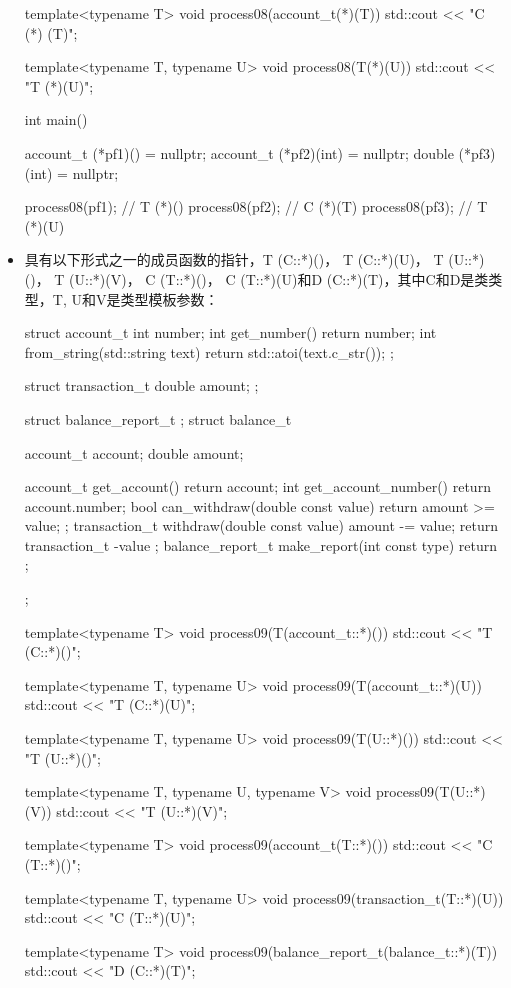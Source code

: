 \begin{itemize}
\begin{cpp}
template<typename T>
void process08(account_t(*)(T))
{ std::cout << "C (*) (T)\n"; }

template<typename T, typename U>
void process08(T(*)(U)) { std::cout << "T (*)(U)\n"; }

int main()
{
	account_t (*pf1)() = nullptr;
	account_t (*pf2)(int) = nullptr;
	double (*pf3)(int) = nullptr;
	
	process08(pf1); // T (*)()
	process08(pf2); // C (*)(T)
	process08(pf3); // T (*)(U)
}
\end{cpp}

\item
具有以下形式之一的成员函数的指针，T (C::*)()， T (C::*)(U)， T (U::*)()， T (U::*)(V)， C (T::*)()， C (T::*)(U)和D (C::*)(T)，其中C和D是类类型，T, U和V是类型模板参数：

\begin{cpp}
struct account_t
{
	int number;
	int get_number() { return number; }
	int from_string(std::string text) {
		return std::atoi(text.c_str()); }
};

struct transaction_t
{
	double amount;
};

struct balance_report_t {};
struct balance_t
{
	account_t account;
	double amount;
	
	account_t get_account() { return account; }
	int get_account_number() { return account.number; }
	bool can_withdraw(double const value)
		{return amount >= value; };
	transaction_t withdraw(double const value) {
		amount -= value; return transaction_t{ -value }; }
	balance_report_t make_report(int const type)
	{return {}; }
};

template<typename T>
void process09(T(account_t::*)())
{ std::cout << "T (C::*)()\n"; }

template<typename T, typename U>
void process09(T(account_t::*)(U))
{ std::cout << "T (C::*)(U)\n"; }

template<typename T, typename U>
void process09(T(U::*)())
{ std::cout << "T (U::*)()\n"; }

template<typename T, typename U, typename V>
void process09(T(U::*)(V))
{ std::cout << "T (U::*)(V)\n"; }

template<typename T>
void process09(account_t(T::*)())
{ std::cout << "C (T::*)()\n"; }

template<typename T, typename U>
void process09(transaction_t(T::*)(U))
{ std::cout << "C (T::*)(U)\n"; }

template<typename T>
void process09(balance_report_t(balance_t::*)(T))
{ std::cout << "D (C::*)(T)\n"; }


\end{cpp}
\end{itemize}
